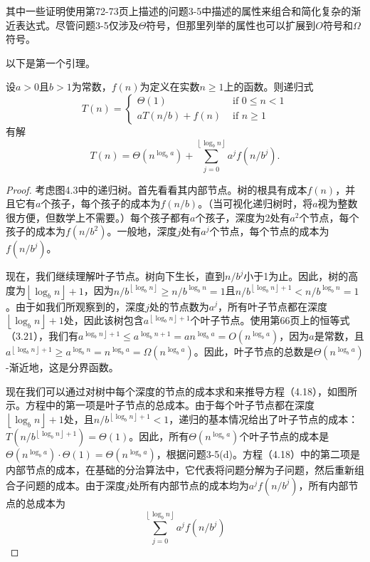 \documentclass[lang=cn,newtx,10pt,scheme=chinese]{elegantbook}
\begin{document}
其中一些证明使用第72-73页上描述的问题3-5中描述的属性来组合和简化复杂的渐近表达式。尽管问题3-5仅涉及$\Theta$符号，但那里列举的属性也可以扩展到$O$符号和$\Omega$符号。

以下是第一个引理。

\begin{lemma}{}{}
设$a>0$且$b>1$为常数，$f(n)$为定义在实数$n \geq 1$上的函数。则递归式
$$
T(n)= \begin{cases}\Theta(1) & \text { if } 0 \leq n<1 \\ a T(n / b)+f(n) & \text { if } n \geq 1\end{cases}
$$
有解
$$
T(n)=\Theta\left(n^{\log _b a}\right)+\sum_{j=0}^{\left\lfloor\log _b n\right\rfloor} a^j f\left(n / b^j\right) .
$$
\end{lemma}

\begin{proof}
考虑图4.3中的递归树。首先看看其内部节点。树的根具有成本$f(n)$，并且它有$a$个孩子，每个孩子的成本为$f(n / b)$。（当可视化递归树时，将$a$视为整数很方便，但数学上不需要。）每个孩子都有$a$个孩子，深度为2处有$a^2$个节点，每个孩子的成本为$f\left(n / b^2\right)$。一般地，深度$j$处有$a^j$个节点，每个节点的成本为$f\left(n / b^j\right)$。

现在，我们继续理解叶子节点。树向下生长，直到$n / b^j$小于1为止。因此，树的高度为$\left\lfloor\log _b n\right\rfloor+1$，因为$n / b^{\left\lfloor\log _b n\right\rfloor} \geq n / b^{\log _b n}=1$且$n / b^{\left\lfloor\log _b n\right\rfloor+1}<n / b^{\log _b n}=1$。由于如我们所观察到的，深度$j$处的节点数为$a^j$，所有叶子节点都在深度$\left\lfloor\log _b n\right\rfloor+1$处，因此该树包含$a^{\left\lfloor\log _b n\right\rfloor+1}$个叶子节点。使用第66页上的恒等式（3.21），我们有$a^{\left.\log _b n\right\rfloor+1} \leq a^{\log _b n+1}=a n^{\log _b a}=O\left(n^{\log _b a}\right)$，因为$a$是常数，且$a^{\left\lfloor\log _b n\right\rfloor+1} \geq a^{\log _b n}=n^{\log _b a}=\Omega\left(n^{\log _b a}\right)$。因此，叶子节点的总数是$\Theta\left(n^{\log _b a}\right)$-渐近地，这是分界函数。

现在我们可以通过对树中每个深度的节点的成本求和来推导方程（4.18），如图所示。方程中的第一项是叶子节点的总成本。由于每个叶子节点都在深度$\left\lfloor\log _b n\right\rfloor+1$处，且$n / b^{\left\lfloor\log _b n\right\rfloor+1}<1$，递归的基本情况给出了叶子节点的成本：$T\left(n / b^{\left\lfloor\log _b n\right\rfloor+1}\right)=\Theta(1)$。因此，所有$\Theta\left(n^{\log _b a}\right)$个叶子节点的成本是$\Theta\left(n^{\log _b a}\right) \cdot \Theta(1)=\Theta\left(n^{\log _b a}\right)$，根据问题3-5(d)。方程（4.18）中的第二项是内部节点的成本，在基础的分治算法中，它代表将问题分解为子问题，然后重新组合子问题的成本。由于深度$j$处所有内部节点的成本均为$a^j f\left(n / b^j\right)$，所有内部节点的总成本为
$$
\sum_{j=0}^{\left\lfloor\log _b n\right\rfloor} a^j f\left(n / b^j\right)
$$
\end{proof}
\end{document}
